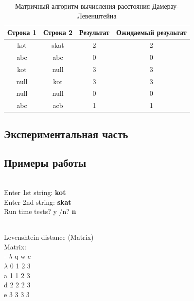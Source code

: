 \documentclass[a4paper,12pt]{article}
\begin{document}
					\begin{table}[H]        		
       				\caption{\label{tabular:test_mtrx_dl} Матричный алгоритм вычисления расстояния Дамерау-Левенштейна}
       				\begin{center}       			
        			\begin{tabular}{|c|c|c|c|}        			
        				\hline
        				Строка 1 & Строка 2 &Результат &Ожидаемый результат \\ 							\hline
        				kot    &skat  &2  &2\\
        				abc  &abc &0  &0\\
        				kot  &null  &3  &3\\
        				null  &kot  &3  &3\\
        				null  &null  &0  &0\\
        				abc  &acb  &1 &1\\ 
        				\hline
        			\end{tabular}
       				\end{center}
	        		\end{table}
	\newpage

    \begin{center}
        \section{Экспериментальная часть}
        \subsection{Примеры работы}
    \end{center}
    
   	\smallskip
	\\
	\smallskip
	Enter 1st string: \textbf{kot}\\
	Enter 2nd string: \textbf{skat}\\
	Run time tests? y \slash n? \textbf{n}
	
	\\
	\smallskip
	\noindent Levenshtein distance (Matrix)\\
	Matrix:\\
    -   $\lambda$   q   w   e\\
    $\lambda$   0   1   2   3\\
    a   1   1   2   3\\
    d   2   2   2   3\\
    e   3   3   3   3
\end{document}
